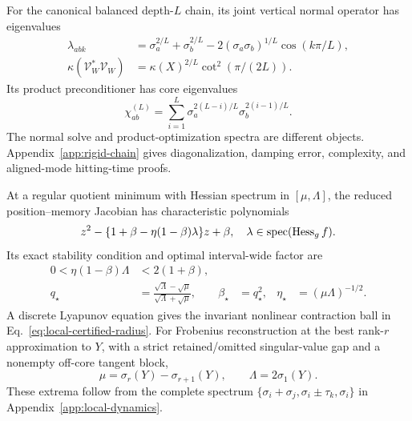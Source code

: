 \begin{theorem}
For the canonical balanced depth-$L$ chain, its joint vertical normal
operator has eigenvalues
\begin{align}
\lambda_{abk}
&=\sigma_a^{2/L}+\sigma_b^{2/L}
-2(\sigma_a\sigma_b)^{1/L}\cos(k\pi/L),\\
\kappa(\mathcal V_W^*\mathcal V_W)
&=\kappa(X)^{2/L}\cot^2(\pi/(2L)).
\end{align}
Its product preconditioner has core eigenvalues
\begin{equation}
\chi_{ab}^{(L)}
=\sum_{i=1}^L\sigma_a^{2(L-i)/L}\sigma_b^{2(i-1)/L}.
\end{equation}
The normal solve and product-optimization spectra are different objects.
Appendix~\ref{app:rigid-chain} gives diagonalization, damping error,
complexity, and aligned-mode hitting-time proofs.
\end{theorem}


\begin{theorem}
At a regular quotient minimum with Hessian spectrum in $[\mu,\Lambda]$,
the reduced position--memory Jacobian has characteristic polynomials
\begin{equation}
z^2-\{1+\beta-\eta(1-\beta)\lambda\}z+\beta,\quad
\lambda\in\operatorname{spec}(\operatorname{Hess}_g f).
\end{equation}
Its exact stability condition and optimal interval-wide factor are
\begin{align}
0<\eta(1-\beta)\Lambda&<2(1+\beta),\\
q_\star&=\frac{\sqrt\Lambda-\sqrt\mu}{\sqrt\Lambda+\sqrt\mu},&
\beta_\star&=q_\star^2,&\eta_\star&=(\mu\Lambda)^{-1/2}.
\end{align}
A discrete Lyapunov equation gives the invariant nonlinear contraction
ball in Eq.~\eqref{eq:local-certified-radius}.
For Frobenius reconstruction at the best rank-$r$ approximation to $Y$,
with a strict retained/omitted singular-value gap and a nonempty
off-core tangent block,
\begin{equation}
\mu=\sigma_r(Y)-\sigma_{r+1}(Y),\qquad
\Lambda=2\sigma_1(Y).
\end{equation}
These extrema follow from the complete spectrum
$\{\sigma_i+\sigma_j,\sigma_i\pm\tau_k,\sigma_i\}$ in
Appendix~\ref{app:local-dynamics}.
\end{theorem}

